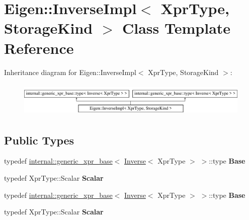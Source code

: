 \hypertarget{class_eigen_1_1_inverse_impl}{}\section{Eigen\+:\+:Inverse\+Impl$<$ Xpr\+Type, Storage\+Kind $>$ Class Template Reference}
\label{class_eigen_1_1_inverse_impl}
Inheritance diagram for Eigen\+:\+:Inverse\+Impl$<$ Xpr\+Type, Storage\+Kind $>$\+:\begin{figure}[H]
\begin{center}
\leavevmode
\includegraphics[height=1.651917cm]{class_eigen_1_1_inverse_impl}
\end{center}
\end{figure}
\subsection*{Public Types}
\begin{DoxyCompactItemize}
\item 
\mbox{\label{class_eigen_1_1_inverse_impl_aadc85dd01febe95ea4372e2f9f77aa92}} 
typedef \hyperlink{struct_eigen_1_1internal_1_1generic__xpr__base}{internal\+::generic\+\_\+xpr\+\_\+base}$<$ \hyperlink{class_eigen_1_1_inverse}{Inverse}$<$ Xpr\+Type $>$ $>$\+::type {\bfseries Base}
\item 
\mbox{\label{class_eigen_1_1_inverse_impl_aafdfa1eaae4244865ad05d1c76d86f27}} 
typedef Xpr\+Type\+::\+Scalar {\bfseries Scalar}
\item 
\mbox{\label{class_eigen_1_1_inverse_impl_aadc85dd01febe95ea4372e2f9f77aa92}} 
typedef \hyperlink{struct_eigen_1_1internal_1_1generic__xpr__base}{internal\+::generic\+\_\+xpr\+\_\+base}$<$ \hyperlink{class_eigen_1_1_inverse}{Inverse}$<$ Xpr\+Type $>$ $>$\+::type {\bfseries Base}
\item 
\mbox{\label{class_eigen_1_1_inverse_impl_aafdfa1eaae4244865ad05d1c76d86f27}} 
typedef Xpr\+Type\+::\+Scalar {\bfseries Scalar}
\end{DoxyCompactItemize}


